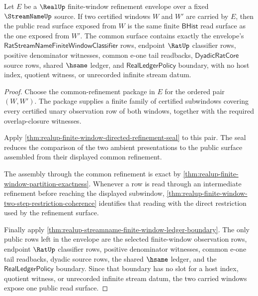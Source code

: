 \begin{theorem}
\label{thm:realup-finite-window-refinement-envelope-coherence}
Let $E$ be a $\RealUp$ finite-window refinement envelope over a fixed
$\StreamNameUp$ source. If two certified windows $W$ and $W'$ are carried by
$E$, then the public read surface exposed from $W$ is the same finite
$\mathsf{BHist}$ read surface as the one exposed from $W'$. The common surface
contains exactly the envelope's
$\mathsf{RatStreamNameFiniteWindowClassifier}$ rows, endpoint $\RatUp$
classifier rows, positive denominator witnesses, common e-one tail readbacks,
$\mathsf{DyadicRatCore}$ source rows, shared $\hsame$ ledger, and
$\mathsf{RealLedgerPolicy}$ boundary, with no host index, quotient witness, or
unrecorded infinite stream datum.
\end{theorem}
\begin{proof}
Choose the common-refinement package in $E$ for the ordered pair $(W,W')$.
The package supplies a finite family of certified subwindows covering every
certified unary observation row of both windows, together with the required
overlap-closure witnesses.

Apply
\autoref{thm:realup-finite-window-directed-refinement-seal} to this pair. The
seal reduces the comparison of the two ambient presentations to the public
surface assembled from their displayed common refinement.

The assembly through the common refinement is exact by
\autoref{thm:realup-finite-window-partition-exactness}. Whenever a row is
read through an intermediate refinement before reaching the displayed
subwindow, \autoref{thm:realup-finite-window-two-step-restriction-coherence}
identifies that reading with the direct restriction used by the refinement
surface.

Finally apply
\autoref{thm:realup-streamname-finite-window-ledger-boundary}. The only public
rows left in the envelope are the selected finite-window observation rows,
endpoint $\RatUp$ classifier rows, positive denominator witnesses, common
e-one tail readbacks, dyadic source rows, the shared $\hsame$ ledger, and the
$\mathsf{RealLedgerPolicy}$ boundary. Since that boundary has no slot for a
host index, quotient witness, or unrecorded infinite stream datum, the two
carried windows expose one public read surface.
\end{proof}

